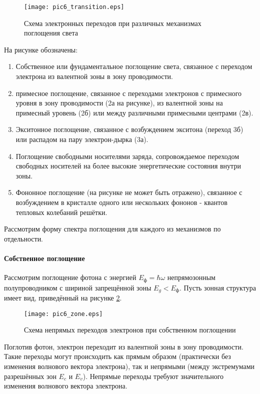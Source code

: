 \begin{figure}[h!]\centering
\texttt{[image: pic6\_transition.eps]}
\caption{Схема электронных переходов при различных механизмах поглощения света}
\label{pic6_transition}
\end{figure}

На рисунке обозначены:

\begin{enumerate}
\item Собственное или фундаментальное поглощение света, связанное с переходом электрона из валентной зоны в зону проводимости.
\item примесное поглощение, связанное с переходами электронов с примесного уровня в зону проводимости (2а на рисунке), из валентной зоны на примесный уровень (2б) или между различными примесными центрами (2в).
\item Экситонное поглощение, связанное с возбуждением экситона (переход 3б) или распадом на пару электрон-дырка (3а).
\item Поглощение свободными носителями заряда, сопровождаемое переходом свободных носителей на более высокие энергетические состояния внутри зоны.
\item Фононное поглощение (на рисунке не может быть отражено), связанное с возбуждением в кристалле одного или нескольких фононов - квантов тепловых колебаний решётки.
\end{enumerate}

Рассмотрим форму спектра поглощения для каждого из механизмов по отдельности.

\paragraph{Собственное поглощение}
Рассмотрим поглощение фотона с энергией $E_{\text{ф}} = \hbar \omega$ непрямозонным полупроводником с шириной запрещённой зоны $E_{g} < E_{\text{ф}}$. Пусть зонная структура имеет вид, приведённый на рисунке \ref{pic6_zone}.

\begin{figure}[h!]\centering
\texttt{[image: pic6\_zone.eps]}
\caption{Схема непрямых переходов электронов при собственном поглощении}
\label{pic6_zone}
\end{figure}

Поглотив фотон, электрон переходит из валентной зоны в зону проводимости. Такие переходы могут происходить как прямым образом (практически без изменения волнового вектора электрона), так и непрямыми (между экстремумами разрешённых зон $E_{c}$ и $E_{v}$). Непрямые переходы требуют значительного изменения волнового вектора электрона.


